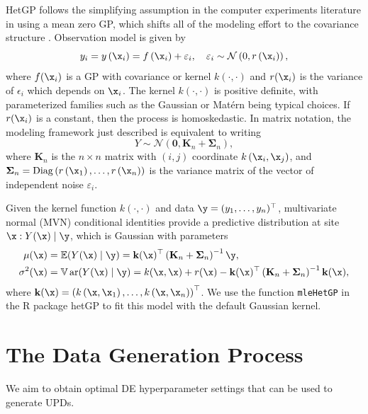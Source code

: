 \documentclass [PhD] {package/uclathes}
\begin{document}
HetGP follows the simplifying assumption in the computer experiments literature in using a mean zero GP, which shifts all of the modeling effort to the covariance structure \parencite{binois2018practical}.
Observation model is given by %
\begin{equation}
y_i = y\left(\x_i\right)=f\left(\x_i\right)+\varepsilon_i, \quad\varepsilon_i \sim \mathcal{N}\left(0, r\left(\x_i\right)\right),
\end{equation}
where $f(\x_i)$ is a GP with covariance or kernel $k(\cdot, \cdot)$ and $r(\x_i)$ is the variance of $\epsilon_i$ which depends on $\x_i$. The  kernel $k(\cdot, \cdot)$ is positive definite, with parameterized families such as the Gaussian or Mat\'ern being typical choices. If $r(\x_i)$ is a constant, then the process is homoskedastic.
In matrix notation, the modeling framework just described is equivalent to writing
$$
Y \sim \mathcal{N}\left(\mathbf{0}, \mathbf{K}_n+\boldsymbol{\Sigma}_n\right),
$$
where $\mathbf{K}_n$ is the $n \times n$ matrix with $(i, j)$ coordinate $k\left(\x_i, \x_j\right)$, and $\boldsymbol{\Sigma}_n=\operatorname{Diag}\left(r\left(\x_1\right), \ldots, r\left(\x_n\right)\right)$ is the variance matrix of the  vector of independent noise $\varepsilon_i$.

Given the kernel function $k(\cdot, \cdot)$ and data $\y=(y_1,\ldots,y_n)^{\top}$, multivariate normal (MVN) conditional identities provide a predictive distribution at site $\x: Y(\x) \mid \y$, which is Gaussian with parameters
$$
\begin{aligned}
\mu(\x) & =\mathbb{E}(Y(\x) \mid \y)=\mathbf{k}(\x)^{\top}\left(\mathbf{K}_n+\mathbf{\Sigma}_n\right)^{-1} \y,  \\
\sigma^2(\x) & =\mathbb{V} \operatorname{ar}(Y(\x) \mid \y)=k(\x, \x)+r(\x)-\mathbf{k}(\x)^{\top}\left(\mathbf{K}_n+\mathbf{\Sigma}_n\right)^{-1} \mathbf{k}(\x) ,
\end{aligned}
$$
where $\mathbf{k}(\x)=\left(k\left(\x, \x_1\right), \ldots, k\left(\x, \x_n\right)\right)^{\top}$.
We use the function \texttt{mleHetGP} in the R package hetGP to fit this model with the default Gaussian kernel.


\section{The Data Generation Process}

We aim to obtain optimal DE hyperparameter settings that can be used to generate UPDs. %
\end{document}
